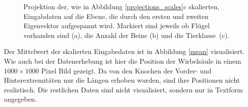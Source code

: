  \begin{figure}
  \qquad
  \qquad
  
  \caption{Projektion der, wie in Abbildung \ref{projections_scales}c skalierten, Eingabdaten auf die Ebene, die durch den ersten und zweiten Eigenvektor aufgespannt wird. Markiert sind jeweils ob Flügel vorhanden sind (a), die Anzahl der Beine (b) und die \mbox{Tierklasse (c)}.}
  \label{projections_tags}
 \end{figure}
 
 
 Der Mittelwert der skalierten Eingabedaten ist in Abbildung \ref{mean} visualisiert.
 Wie auch bei der Datenerhebung ist hier die Position der Wirbelsäule in einem $1000 \times 1000$ Pixel Bild gezeigt. Da von den Knochen der Vorder- und Hinterextremitäten nur die Längen erhoben wurden, sind ihre Positionen nicht realistisch. Die restlichen Daten sind nicht visualisiert, sondern nur in Textform angegeben.
 
